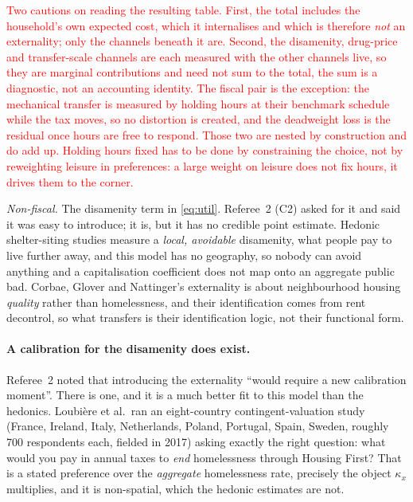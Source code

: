 \documentclass[11pt]{article}
\newcommand{\nw}[1]{\textcolor{red}{#1}}
\begin{document}
\nw{Two cautions on reading the resulting table. First, the total includes the
household's own expected cost, which it internalises and which is therefore
\emph{not} an externality; only the channels beneath it are. Second, the
disamenity, drug-price and transfer-scale channels are each measured with the
other channels live, so they are marginal contributions and need not sum to the
total, the sum is a diagnostic, not an accounting identity. The fiscal pair is
the exception: the mechanical transfer is measured by holding hours at their
benchmark schedule while the tax moves, so no distortion is created, and the
deadweight loss is the residual once hours are free to respond. Those two are
nested by construction and do add up. Holding hours fixed has to be done by
constraining the choice, not by reweighting leisure in preferences: a large
weight on leisure does not fix hours, it drives them to the corner.}

\emph{Non-fiscal.} The disamenity term in \eqref{eq:util}. Referee~2 (C2) asked
for it and said it was easy to introduce; it is, but it has no credible point
estimate. Hedonic shelter-siting studies measure a \emph{local, avoidable}
disamenity, what people pay to live further away, and this model has no
geography, so nobody can avoid anything and a capitalisation coefficient does not
map onto an aggregate public bad. Corbae, Glover and Nattinger's externality is
about neighbourhood housing \emph{quality} rather than homelessness, and their
identification comes from rent decontrol, so what transfers is their
identification logic, not their functional form.

\paragraph{A calibration for the disamenity does exist.} Referee~2 noted that
introducing the externality ``would require a new calibration moment''. There is
one, and it is a much better fit to this model than the hedonics. Loubi\`ere et
al.\ ran an eight-country contingent-valuation study (France, Ireland, Italy,
Netherlands, Poland, Portugal, Spain, Sweden, roughly 700 respondents each,
fielded in 2017) asking exactly the right question: what would you pay in annual
taxes to \emph{end} homelessness through Housing First? That is a stated
preference over the \emph{aggregate} homelessness rate, precisely the object
$\kappa_x$ multiplies, and it is non-spatial, which the hedonic estimates are
not.
\end{document}
